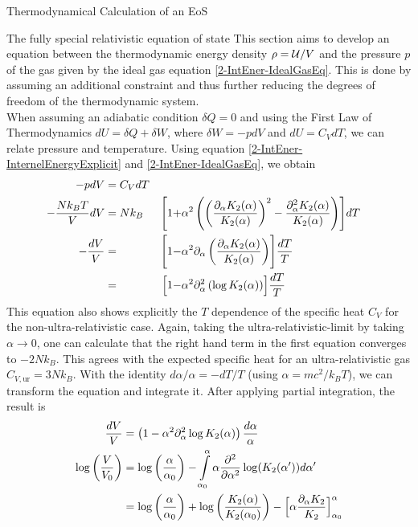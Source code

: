 \begin{section}{Thermodynamical Calculation of an EoS}
%
%
%
\begin{subsection}{The fully special relativistic equation of state}
This section aims to develop an equation between the thermodynamic energy density $\rho=\mathcal{U}/V$ and the pressure $p$ of the gas given by the ideal gas equation \eqref{2-IntEner-IdealGasEq}. This is done by assuming an additional constraint and thus further reducing the degrees of freedom of the thermodynamic system.\\
When assuming an adiabatic condition $\delta Q=0$ and using the First Law of Thermodynamics $dU = \delta Q + \delta W$, where $\delta W=-pdV$ and $dU=C_VdT$, we can relate pressure and temperature. Using equation \ref{2-IntEner-InternelEnergyExplicit} and \ref{2-IntEner-IdealGasEq}, we obtain
\begin{alignat}{3}
    -pdV &= C_VdT\\
    -\frac{Nk_BT}{V}dV &= Nk_B &\Biggl[1 + &\alpha^2\left(\left(\frac{\partial_\alpha K_2(\alpha)}{K_2(\alpha)}\right)^2 - \frac{\partial^2_\alpha K_2(\alpha)}{K_2(\alpha)}\right)\Biggr]dT\\
    - \frac{dV}{V} &= &\Biggl[1 - &\alpha^2\partial_\alpha\left(\frac{\partial_\alpha K_2(\alpha)}{K_2(\alpha)}\right)\Biggr]\frac{dT}{T}\\
    &= &\Bigl[1 - &\alpha^2\partial_\alpha^2\left(\log K_2(\alpha)\right)\Bigr]\frac{dT}{T}
\end{alignat}
This equation also shows explicitly the $T$ dependence of the specific heat $C_V$ for the non-ultra-relativistic case. Again, taking the ultra-relativistic-limit by taking $\alpha\rightarrow0$, one can calculate that the right hand term in the first equation converges to $-2Nk_B$. This agrees with the expected specific heat for an ultra-relativistic gas $C_{V,\text{ur}}=3Nk_B$. With the identity $d\alpha/\alpha = -dT/T$ (using $\alpha=mc^2/k_BT$), we can transform the equation and integrate it. After applying partial integration, the result is
\begin{align}
	\frac{dV}{V} &= \left(1-\alpha^2\partial_\alpha^2\log K_2(\alpha)\right)\frac{d\alpha}{\alpha}\\
    \log\left(\frac{V}{V_0}\right) &= \log\left(\frac{\alpha}{\alpha_0}\right) - \int\limits_{\alpha_0}^\alpha \alpha\frac{\partial^2}{\partial \alpha^2}\log(K_2(\alpha'))d\alpha'\\
    &=\log\left(\frac{\alpha}{\alpha_0}\right) + \log\left(\frac{K_2(\alpha)}{K_2(\alpha_0)}\right) - \Bigl[\alpha\frac{\partial_\alpha K_2}{K_2}\Bigr]_{\alpha_0}^\alpha
\end{align}

\end{subsection}
\end{section}
